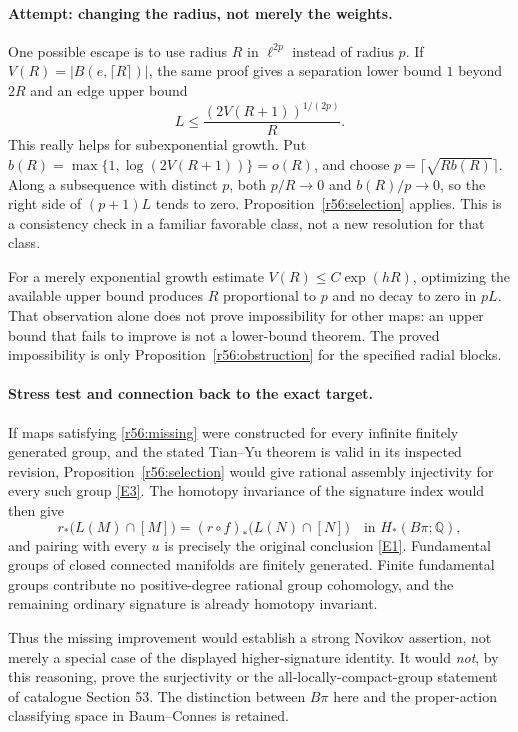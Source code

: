 \documentclass[11pt,a4paper]{article}
\newcommand{\Q}{\mathbb{Q}}
\newcommand{\eref}[2]{\hyperlink{extra:#1:#2}{[E#2]}}
\numberwithin{equation}{section}
\begin{document}
\paragraph{Attempt: changing the radius, not merely the weights.}
One possible escape is to use radius $R$ in $\ell^{2p}$ instead of radius $p$. If $V(R)=|B(e,\lceil R\rceil)|$, the same proof gives a separation lower bound $1$ beyond $2R$ and an edge upper bound
\begin{equation}\label{r56:larger-radius}
 L\leq\frac{(2V(R+1))^{1/(2p)}}{R}.
\end{equation}
This really helps for subexponential growth. Put
$b(R)=\max\{1,\log(2V(R+1))\}=o(R)$, and choose
$p=\lceil\sqrt{Rb(R)}\rceil$. Along a subsequence with distinct $p$, both $p/R\to0$ and $b(R)/p\to0$, so the right side of $(p+1)L$ tends to zero. Proposition~\ref{r56:selection} applies. This is a consistency check in a familiar favorable class, not a new resolution for that class.

For a merely exponential growth estimate $V(R)\leq C\exp(hR)$, optimizing the available upper bound produces $R$ proportional to $p$ and no decay to zero in $pL$. That observation alone does not prove impossibility for other maps: an upper bound that fails to improve is not a lower-bound theorem. The proved impossibility is only Proposition~\ref{r56:obstruction} for the specified radial blocks.

\paragraph{Stress test and connection back to the exact target.}
If maps satisfying \eqref{r56:missing} were constructed for every infinite finitely generated group, and the stated Tian--Yu theorem is valid in its inspected revision, Proposition~\ref{r56:selection} would give rational assembly injectivity for every such group \eref{30001499}{3}. The homotopy invariance of the signature index would then give
\[
 r_*\bigl(L(M)\cap[M]\bigr)
  =(r\circ f)_*\bigl(L(N)\cap[N]\bigr)
       \quad\text{in }H_*(B\pi;\Q),
\]
and pairing with every $u$ is precisely the original conclusion \eref{30001499}{1}. Fundamental groups of closed connected manifolds are finitely generated. Finite fundamental groups contribute no positive-degree rational group cohomology, and the remaining ordinary signature is already homotopy invariant.

Thus the missing improvement would establish a strong Novikov assertion, not merely a special case of the displayed higher-signature identity. It would \emph{not}, by this reasoning, prove the surjectivity or the all-locally-compact-group statement of catalogue Section 53. The distinction between $B\pi$ here and the proper-action classifying space in Baum--Connes is retained.
\end{document}
